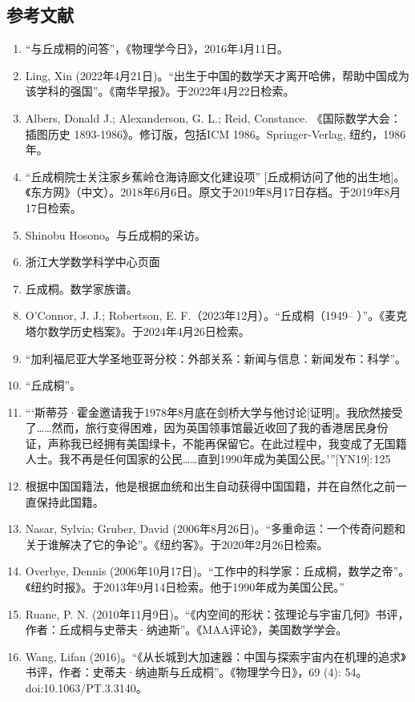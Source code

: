\subsection{参考文献}  
\begin{enumerate}
\item “与丘成桐的问答”，《物理学今日》，2016年4月11日。  
\item Ling, Xin (2022年4月21日)。“出生于中国的数学天才离开哈佛，帮助中国成为该学科的强国”。《南华早报》。于2022年4月22日检索。  
\item Albers, Donald J.; Alexanderson, G. L.; Reid, Constance. 《国际数学大会：插图历史 1893-1986》。修订版，包括ICM 1986。Springer-Verlag, 纽约，1986年。  
\item “丘成桐院士关注家乡蕉岭仓海诗廊文化建设项” [丘成桐访问了他的出生地]。《东方网》（中文）。2018年6月6日。原文于2019年8月17日存档。于2019年8月17日检索。  
\item Shinobu Hosono。与丘成桐的采访。  
\item 浙江大学数学科学中心页面  
\item 丘成桐。数学家族谱。
\item O'Connor, J. J.; Robertson, E. F.（2023年12月）。“丘成桐（1949– ）”。《麦克塔尔数学历史档案》。于2024年4月26日检索。  
\item “加利福尼亚大学圣地亚哥分校：外部关系：新闻与信息：新闻发布：科学”。  
\item “丘成桐”。
\item “‘斯蒂芬·霍金邀请我于1978年8月底在剑桥大学与他讨论[证明]。我欣然接受了……然而，旅行变得困难，因为英国领事馆最近收回了我的香港居民身份证，声称我已经拥有美国绿卡，不能再保留它。在此过程中，我变成了无国籍人士。我不再是任何国家的公民……直到1990年成为美国公民。’”[YN19]: 125   
\item 根据中国国籍法，他是根据血统和出生自动获得中国国籍，并在自然化之前一直保持此国籍。  
\item Nasar, Sylvia; Gruber, David (2006年8月26日)。“多重命运：一个传奇问题和关于谁解决了它的争论”。《纽约客》。于2020年2月26日检索。  
\item Overbye, Dennis (2006年10月17日)。“工作中的科学家：丘成桐，数学之帝”。《纽约时报》。于2013年9月14日检索。他于1990年成为美国公民。”
\item Ruane, P. N. (2010年11月9日)。“《内空间的形状：弦理论与宇宙几何》书评，作者：丘成桐与史蒂夫·纳迪斯”。《MAA评论》，美国数学学会。  
\item Wang, Lifan (2016)。“《从长城到大加速器：中国与探索宇宙内在机理的追求》书评，作者：史蒂夫·纳迪斯与丘成桐”。《物理学今日》，69 (4): 54。doi:10.1063/PT.3.3140。  

\end{enumerate}
